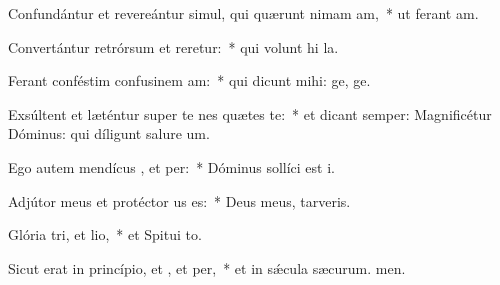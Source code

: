 \item Confundántur et revereántur simul, qui quærunt nimam am,~* ut ferant am.
\item Convertántur retrórsum et reretur:~* qui volunt hi la.
\item Ferant conféstim confusinem am:~* qui dicunt mihi: ge, ge.
\item Exsúltent et læténtur super te nes quætes te:~* et dicant semper: Magnificétur Dóminus: qui díligunt salure um.
\item Ego autem mendícus , et per:~* Dóminus sollíci est i.
\item Adjútor meus et protéctor us  es:~* Deus meus,  tarveris.
\item Glória tri, et lio,~* et Spitui to.
\item Sicut erat in princípio, et , et per,~* et in sǽcula sæcurum. men.
